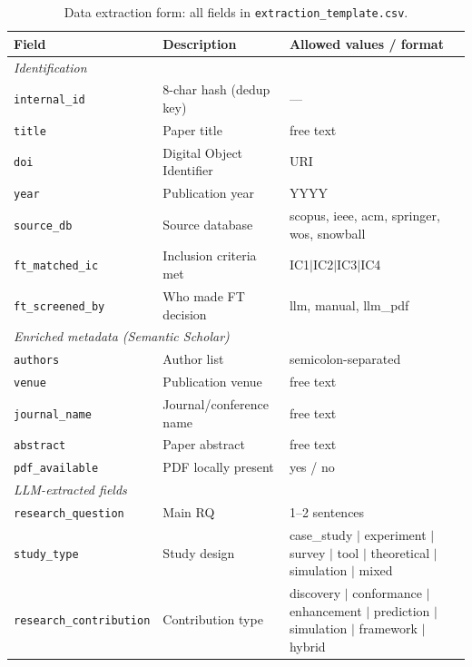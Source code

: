 \begin{table}[htbp]
\centering
\caption{Data extraction form: all fields in \texttt{extraction\_template.csv}.}
\label{tab:app-extraction-fields}
\footnotesize
\setlength{\tabcolsep}{3pt}
\begin{tabular}{p{3.2cm} p{4.4cm} p{4.6cm}}
\toprule
\textbf{Field} & \textbf{Description} & \textbf{Allowed values / format} \\
\midrule
\multicolumn{3}{l}{\textit{Identification}} \\
\texttt{internal\_id}   & 8-char hash (dedup key)      & --- \\
\texttt{title}          & Paper title                  & free text \\
\texttt{doi}            & Digital Object Identifier    & URI \\
\texttt{year}           & Publication year             & YYYY \\
\texttt{source\_db}     & Source database              & scopus, ieee, acm, springer, wos, snowball \\
\texttt{ft\_matched\_ic}& Inclusion criteria met       & IC1$|$IC2$|$IC3$|$IC4 \\
\texttt{ft\_screened\_by}& Who made FT decision        & llm, manual, llm\_pdf \\
\midrule
\multicolumn{3}{l}{\textit{Enriched metadata (Semantic Scholar)}} \\
\texttt{authors}        & Author list                  & semicolon-separated \\
\texttt{venue}          & Publication venue            & free text \\
\texttt{journal\_name}  & Journal/conference name      & free text \\
\texttt{abstract}       & Paper abstract               & free text \\
\texttt{pdf\_available} & PDF locally present          & yes / no \\
\midrule
\multicolumn{3}{l}{\textit{LLM-extracted fields}} \\
\texttt{research\_question} & Main RQ               & 1--2 sentences \\
\texttt{study\_type}        & Study design          & case\_study $|$ experiment $|$ survey $|$ tool $|$ theoretical $|$ simulation $|$ mixed \\
\texttt{research\_contribution} & Contribution type & discovery $|$ conformance $|$ enhancement $|$ prediction $|$ simulation $|$ framework $|$ hybrid \\

\end{tabular}
\end{table}

